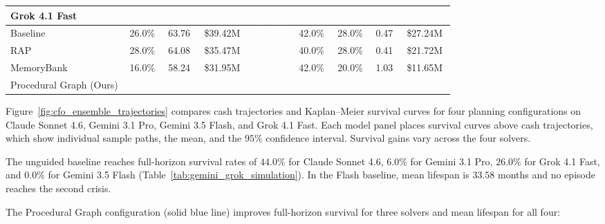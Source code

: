 \begin{table}[htbp]
\begin{tabular}{l c c c c c c c c}
\midrule

\multicolumn{9}{l}{\textbf{Grok 4.1 Fast}} \\
\midrule
\quad Baseline                      & 26.0\% & 63.76 & \$39.42M & \cellcolor{GoogleRed}\textcolor{white}{\textbf{100.0\%}} & 42.0\% & 28.0\% & 0.47  & \$27.24M \\
\quad RAP~\citep{kagaya2024rap}              & 28.0\% & 64.08 & \$35.47M & \cellcolor{GoogleRed}\textcolor{white}{\textbf{100.0\%}} & 40.0\% & 28.0\% & 0.41  & \$21.72M \\
\quad MemoryBank~\citep{zhong2024memorybank}         & 16.0\% & 58.24 & \$31.95M & \cellcolor{GoogleRed}\textcolor{white}{\textbf{100.0\%}} & 42.0\% & 20.0\% & 1.03  & \$11.65M \\
\quad Procedural Graph (Ours)           & \cellcolor{GoogleRed}\textcolor{white}{\textbf{40.0\%}} & \cellcolor{GoogleRed}\textcolor{white}{\textbf{75.14}} & \cellcolor{GoogleRed}\textcolor{white}{\textbf{\$39.62M}} & \cellcolor{GoogleRed}\textcolor{white}{\textbf{100.0\%}} & \cellcolor{GoogleRed}\textcolor{white}{\textbf{50.0\%}} & \cellcolor{GoogleRed}\textcolor{white}{\textbf{40.0\%}} & \cellcolor{GoogleRed}\textcolor{white}{\textbf{0.40}}  & \cellcolor{GoogleRed}\textcolor{white}{\textbf{\$30.11M}} \\

\bottomrule
\end{tabular}
\end{table}

Figure~\ref{fig:cfo_ensemble_trajectories} compares cash trajectories and Kaplan--Meier survival curves for four planning configurations on Claude Sonnet 4.6, Gemini 3.1 Pro, Gemini 3.5 Flash, and Grok 4.1 Fast. Each model panel places survival curves above cash trajectories, which show individual sample paths, the mean, and the $95\%$ confidence interval. Survival gains vary across the four solvers.

The unguided baseline reaches full-horizon survival rates of $44.0\%$ for Claude Sonnet 4.6, $6.0\%$ for Gemini 3.1 Pro, $26.0\%$ for Grok 4.1 Fast, and $0.0\%$ for Gemini 3.5 Flash (Table~\ref{tab:gemini_grok_simulation}). In the Flash baseline, mean lifespan is $33.58$ months and no episode reaches the second crisis.

The Procedural Graph configuration (solid blue line) improves full-horizon survival for three solvers and mean lifespan for all four:

